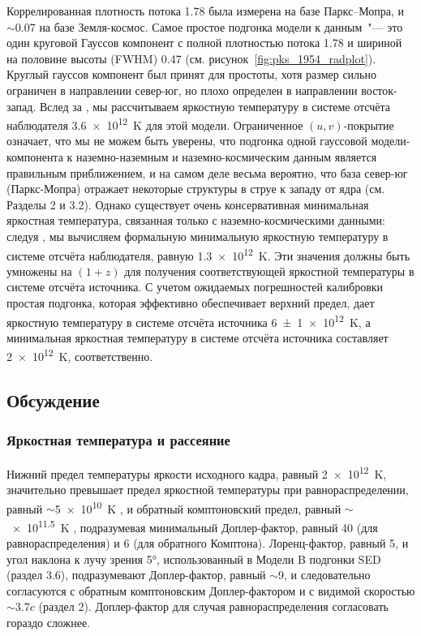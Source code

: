 Коррелированная плотность потока \SI{1.78}{\jansky} была измерена на базе Паркс--Мопра, и
$\sim$\SI{0.07}{\jansky} на базе Земля-космос. Самое простое подгонка модели к данным~"---
это один круговой Гауссов компонент с полной плотностью потока \SI{1.78}{\jansky} и шириной на
половине высоты (FWHM) \SI{0.47}{\mas} (см. рисунок~\ref{fig:pks_1954_radplot}). Круглый гауссов
компонент был принят для простоты, хотя размер сильно ограничен в направлении север-юг, но плохо
определен в направлении восток-запад. Вслед за \cite{Kovalev_2005}, мы рассчитываем яркостную
температуру в системе отсчёта наблюдателя \SI{3.6e12}{\kelvin} для этой модели. Ограниченное $(u,
v)$-покрытие означает, что мы не можем быть уверены, что подгонка одной гауссовой модели-компонента
к наземно-наземным и наземно-космическим данным является правильным приближением, и на самом деле
весьма вероятно, что база север-юг (Паркс-Мопра) отражает некоторые структуры в струе к западу от
ядра (см. Разделы 2 и 3.2). Однако существует очень консервативная минимальная яркостная
температура, связанная только с наземно-космическими данными: следуя \cite{Lobanov_2015a}, мы
вычисляем формальную минимальную яркостную температуру в системе отсчёта наблюдателя, равную
\SI{1.3e12}{\kelvin}. Эти значения должны быть умножены на $(1 + z)$ для получения соответствующей
яркостной температуры в системе отсчёта источника. С учетом ожидаемых погрешностей калибровки
простая подгонка, которая эффективно обеспечивает верхний предел, дает яркостную температуру в
системе отсчёта источника \SI{6(1)e12}{\kelvin}, а минимальная яркостная температуру в системе
отсчёта источника составляет \SI{2e12}{\kelvin}, соответственно.

\subsection{Обсуждение}

\subsubsection{Яркостная температура и рассеяние}

Нижний предел температуры яркости исходного кадра, равный \SI{2e12}{\kelvin}, значительно превышает
предел яркостной температуры при равнораспределении, равный $\sim$\SI{5e10}{\kelvin}
\cite{Readhead_1994}, и обратный комптоновский предел, равный $\sim$\SI{e11.5}{\kelvin}
\cite{Kellermann_1969,Readhead_1994}, подразумевая минимальный Доплер-фактор, равный 40 (для
равнораспределения) и 6 (для обратного Комптона). Лоренц-фактор, равный 5, и угол наклона к лучу
зрения \ang{5}, использованный в Модели B подгонки SED (раздел 3.6), подразумевают Доплер-фактор,
равный $\sim$9, и следовательно согласуются с обратным комптоновским Доплер-фактором и с видимой
скоростью $\sim3.7c$ (раздел 2). Доплер-фактор для случая равнораспределения согласовать гораздо
сложнее.

